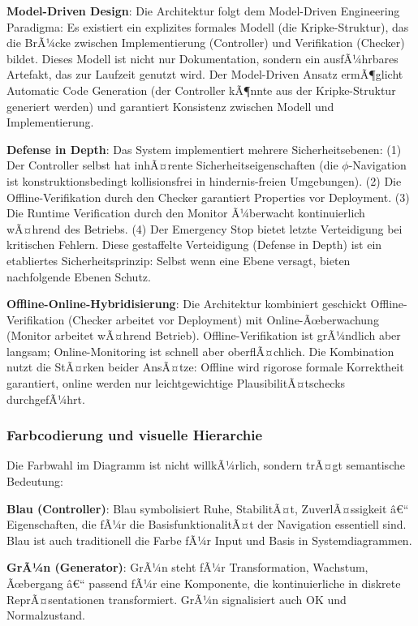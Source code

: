 ﻿\documentclass[a4paper,12pt]{article}
\theoremstyle{definition}
\begin{document}
\textbf{Model-Driven Design}: Die Architektur folgt dem Model-Driven Engineering Paradigma: Es existiert ein explizites formales Modell (die Kripke-Struktur), das die BrÃ¼cke zwischen Implementierung (Controller) und Verifikation (Checker) bildet. Dieses Modell ist nicht nur Dokumentation, sondern ein ausfÃ¼hrbares Artefakt, das zur Laufzeit genutzt wird. Der Model-Driven Ansatz ermÃ¶glicht Automatic Code Generation (der Controller kÃ¶nnte aus der Kripke-Struktur generiert werden) und garantiert Konsistenz zwischen Modell und Implementierung.

\textbf{Defense in Depth}: Das System implementiert mehrere Sicherheitsebenen: (1) Der Controller selbst hat inhÃ¤rente Sicherheitseigenschaften (die $\phi$-Navigation ist konstruktionsbedingt kollisionsfrei in hindernis-freien Umgebungen). (2) Die Offline-Verifikation durch den Checker garantiert Properties vor Deployment. (3) Die Runtime Verification durch den Monitor Ã¼berwacht kontinuierlich wÃ¤hrend des Betriebs. (4) Der Emergency Stop bietet letzte Verteidigung bei kritischen Fehlern. Diese gestaffelte Verteidigung (Defense in Depth) ist ein etabliertes Sicherheitsprinzip: Selbst wenn eine Ebene versagt, bieten nachfolgende Ebenen Schutz.

\textbf{Offline-Online-Hybridisierung}: Die Architektur kombiniert geschickt Offline-Veri\-fikation (Checker arbeitet vor Deployment) mit Online-Ãœberwachung (Monitor arbeitet wÃ¤hrend Betrieb). Offline-Veri\-fi\-kation ist grÃ¼ndlich aber langsam; Online-Monitoring ist schnell aber oberflÃ¤chlich. Die Kombination nutzt die StÃ¤rken beider AnsÃ¤tze: Offline wird rigorose formale Korrektheit garantiert, online werden nur leichtgewichtige PlausibilitÃ¤tschecks durchgefÃ¼hrt.

\subsubsection{Farbcodierung und visuelle Hierarchie}

Die Farbwahl im Diagramm ist nicht willkÃ¼rlich, sondern trÃ¤gt semantische Bedeutung:

\textbf{Blau (Controller)}: Blau symbolisiert Ruhe, StabilitÃ¤t, ZuverlÃ¤ssigkeit â€“ Eigenschaften, die fÃ¼r die BasisfunktionalitÃ¤t der Navigation essentiell sind. Blau ist auch traditionell die Farbe fÃ¼r Input und Basis in Systemdiagrammen.

\textbf{GrÃ¼n (Generator)}: GrÃ¼n steht fÃ¼r Transformation, Wachstum, Ãœbergang â€“ passend fÃ¼r eine Komponente, die kontinuierliche in diskrete ReprÃ¤sentationen transformiert. GrÃ¼n signalisiert auch OK und Normalzustand.
\end{document}
